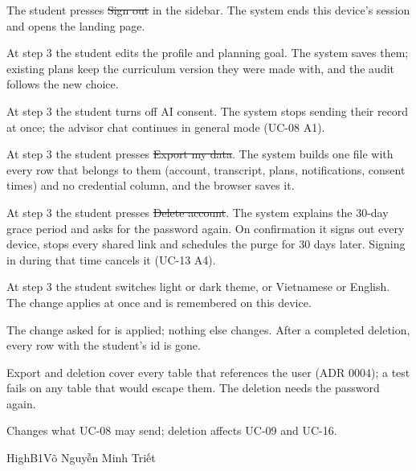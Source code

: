 \begin{altflows}
  \item[A1. Sign out here.] The student presses \st{Sign out} in the sidebar. The system ends this device's session and
        opens the landing page.
  \item[A2. Change program, cohort or goal.] At step 3 the student edits the profile and planning goal. The system saves
        them; existing plans keep the curriculum version they were made with, and the audit follows the new choice.
  \item[A3. Withdraw AI consent.] At step 3 the student turns off AI consent. The system stops sending their record at
        once; the advisor chat continues in general mode (UC-08 A1).
  \item[A4. Export the account.] At step 3 the student presses \st{Export my data}. The system builds one file with every
        row that belongs to them (account, transcript, plans, notifications, consent times) and no credential column, and
        the browser saves it.
  \item[A5. Delete the account.] At step 3 the student presses \st{Delete account}. The system explains the 30-day grace
        period and asks for the password again. On confirmation it signs out every device, stops every shared link and
        schedules the purge for 30 days later. Signing in during that time cancels it (UC-13 A4).
  \item[A6. Theme and language.] At step 3 the student switches light or dark theme, or Vietnamese or English. The change
        applies at once and is remembered on this device.
\end{altflows}

The change asked for is applied; nothing else changes. After a completed deletion, every row with the student's id is
gone.

Export and deletion cover every table that references the user (ADR 0004); a test fails on any table that would escape
them. The deletion needs the password again.

Changes what UC-08 may send; deletion affects UC-09 and UC-16.

%
{High}{B1}{Võ Nguyễn Minh Triết}

